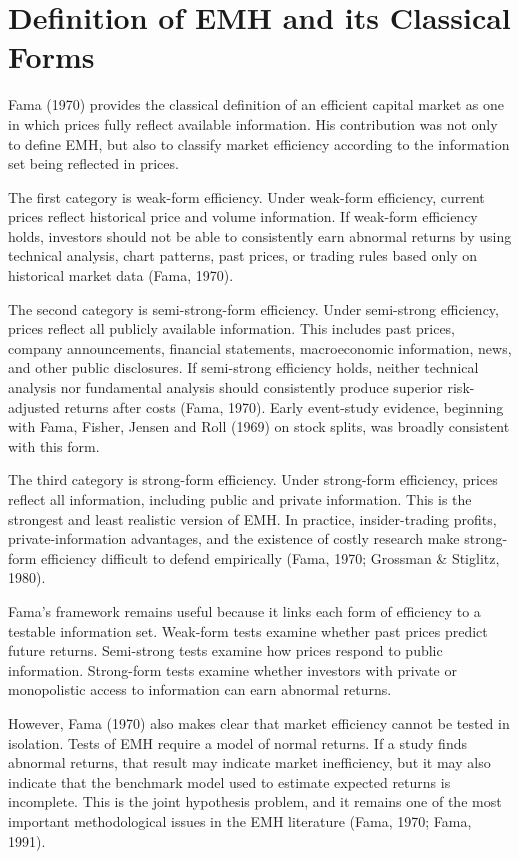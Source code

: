 \documentclass[11pt,a4paper]{article}
\begin{document}
\section{Definition of EMH and its Classical Forms}

Fama (1970) provides the classical definition of an efficient capital market as one in which prices fully reflect available information. His contribution was not only to define EMH, but also to classify market efficiency according to the information set being reflected in prices.

The first category is weak-form efficiency. Under weak-form efficiency, current prices reflect historical price and volume information. If weak-form efficiency holds, investors should not be able to consistently earn abnormal returns by using technical analysis, chart patterns, past prices, or trading rules based only on historical market data (Fama, 1970).

The second category is semi-strong-form efficiency. Under semi-strong efficiency, prices reflect all publicly available information. This includes past prices, company announcements, financial statements, macroeconomic information, news, and other public disclosures. If semi-strong efficiency holds, neither technical analysis nor fundamental analysis should consistently produce superior risk-adjusted returns after costs (Fama, 1970). Early event-study evidence, beginning with Fama, Fisher, Jensen and Roll (1969) on stock splits, was broadly consistent with this form.

The third category is strong-form efficiency. Under strong-form efficiency, prices reflect all information, including public and private information. This is the strongest and least realistic version of EMH. In practice, insider-trading profits, private-information advantages, and the existence of costly research make strong-form efficiency difficult to defend empirically (Fama, 1970; Grossman \& Stiglitz, 1980).

Fama's framework remains useful because it links each form of efficiency to a testable information set. Weak-form tests examine whether past prices predict future returns. Semi-strong tests examine how prices respond to public information. Strong-form tests examine whether investors with private or monopolistic access to information can earn abnormal returns.

However, Fama (1970) also makes clear that market efficiency cannot be tested in isolation. Tests of EMH require a model of normal returns. If a study finds abnormal returns, that result may indicate market inefficiency, but it may also indicate that the benchmark model used to estimate expected returns is incomplete. This is the joint hypothesis problem, and it remains one of the most important methodological issues in the EMH literature (Fama, 1970; Fama, 1991).
\end{document}
